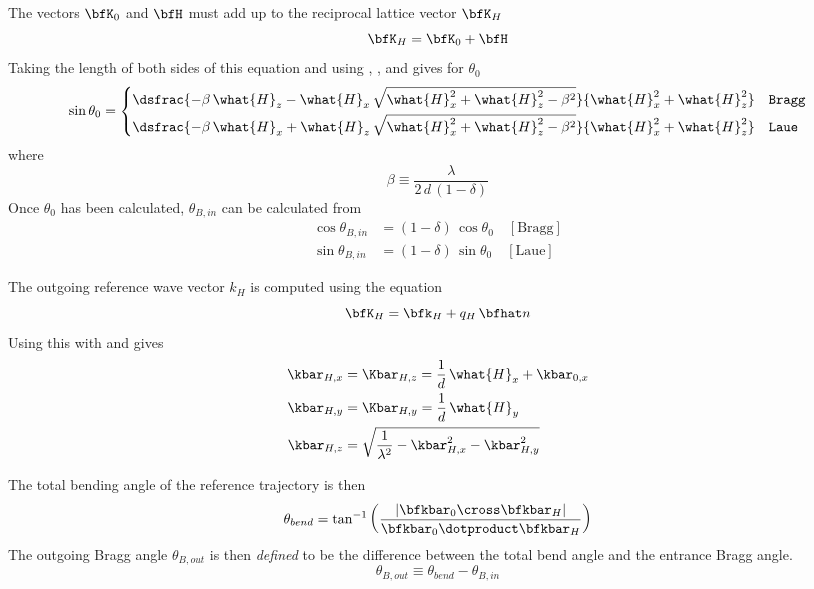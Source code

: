 The vectors $\bfK_0$ and $\bfH$ must add up to the reciprocal lattice vector $\bfK_H$
\begin{equation}
  \bfK_H = \bfK_0 + \bfH
  \label{kkh}
\end{equation}
Taking the length of both sides of this equation and using
, , and  gives for
$\theta_0$
\begin{equation}
  \sin \theta_0 = 
  \begin{dcases}
    \dsfrac{-\beta \, \what{H}_z - \what{H}_x \, \sqrt{\what{H}_x^2 + \what{H}_z^2 - \beta^2}}
    {\what{H}_x^2 + \what{H}_z^2} & \vn{Bragg} \\
    \dsfrac{-\beta \, \what{H}_x + \what{H}_z \, \sqrt{\what{H}_x^2 + \what{H}_z^2 - \beta^2}}
    {\what{H}_x^2 + \what{H}_z^2} & \vn{Laue}
  \end{dcases}
\end{equation}
where
\begin{equation}
  \beta \equiv \frac{\lambda}{2 \, d \, (1 - \delta)}
\end{equation}
Once $\theta_0$ has been calculated, $\theta_{B,in}$ can be calculated from 
\begin{align}
  \cos\theta_{B,in} &= (1 - \delta) \, \cos\theta_0 \quad [\text{Bragg}] \\
  \sin\theta_{B,in} &= (1 - \delta) \, \sin\theta_0 \quad [\text{Laue}] 
\end{align}

The outgoing reference wave vector $k_H$ is computed using the equation
\begin{equation}
  \bfK_H = \bfk_H + q_H \, \bfhat n
  \label{kkqn2}
\end{equation}
Using this with  and  gives
\begin{align}
  \kbar_{H,x} &= \Kbar_{H,z} = \frac{1}{d} \, \what{H}_x + \kbar_{0,x} \CRNO
  \kbar_{H,y} &= \Kbar_{H,y} = \frac{1}{d} \, \what{H}_y 
  \label{k1dapl} \\
  \kbar_{H,z} &= \sqrt{\frac{1}{\lambda^2} - \kbar_{H,x}^2 - \kbar_{H,y}^2} \nonumber
\end{align}

The total bending angle of the reference trajectory is then
\begin{equation}
  \theta_{bend} = \tan^{-1} 
  \left( \frac{ | \bfkbar_0 \cross \bfkbar_H | }{\bfkbar_0 \dotproduct \bfkbar_H} \right) 
\end{equation}
The outgoing Bragg angle $\theta_{B,out}$ is then {\em defined} to be
the difference between the total bend angle and the entrance Bragg angle.
\begin{equation}
  \theta_{B,out} \equiv \theta_{bend} - \theta_{B,in}
\end{equation}

